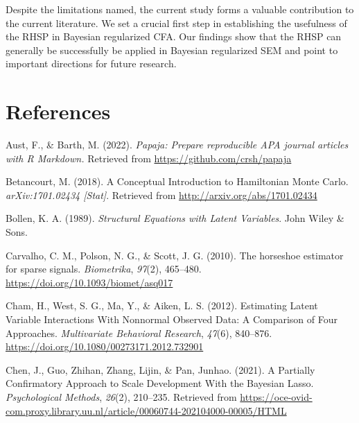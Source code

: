 \documentclass[
  man, donotrepeattitle,floatsintext]{apa6}
\newlength{\cslhangindent}
\newlength{\cslentryspacingunit} %
\newenvironment{CSLReferences}[2] %
 {%
  \setlength{\parindent}{0pt}
  \ifodd #1
  \let\oldpar\par
  \def\par{\hangindent=\cslhangindent\oldpar}
  \fi
  \setlength{\parskip}{#2\cslentryspacingunit}
 }%
 {}
\begin{document}
Despite the limitations named, the current study forms a valuable
contribution to the current literature. We set a crucial first step in
establishing the usefulness of the RHSP in Bayesian regularized CFA. Our
findings show that the RHSP can generally be successfully be applied in
Bayesian regularized SEM and point to important directions for future
research.

\clearpage

\begingroup
\setlength{\parindent}{-0.5in}
\setlength{\leftskip}{0.5in}

\section*{References}

\hypertarget{refs}{}
\begin{CSLReferences}{1}{0}
\leavevmode{}%
Aust, F., \& Barth, M. (2022). \emph{Papaja: {Prepare} reproducible {APA} journal articles with {R} {Markdown}.} Retrieved from \url{https://github.com/crsh/papaja}

\leavevmode{}%
Betancourt, M. (2018). A {Conceptual} {Introduction} to {Hamiltonian} {Monte} {Carlo}. \emph{arXiv:1701.02434 {[}Stat{]}}. Retrieved from \url{http://arxiv.org/abs/1701.02434}

\leavevmode{}%
Bollen, K. A. (1989). \emph{Structural {Equations} with {Latent} {Variables}}. John Wiley \& Sons.

\leavevmode{}%
Carvalho, C. M., Polson, N. G., \& Scott, J. G. (2010). The horseshoe estimator for sparse signals. \emph{Biometrika}, \emph{97}(2), 465--480. \url{https://doi.org/10.1093/biomet/asq017}

\leavevmode{}%
Cham, H., West, S. G., Ma, Y., \& Aiken, L. S. (2012). Estimating {Latent} {Variable} {Interactions} {With} {Nonnormal} {Observed} {Data}: {A} {Comparison} of {Four} {Approaches}. \emph{Multivariate Behavioral Research}, \emph{47}(6), 840--876. \url{https://doi.org/10.1080/00273171.2012.732901}

\leavevmode{}%
Chen, J., Guo, Zhihan, Zhang, Lijin, \& Pan, Junhao. (2021). A {Partially} {Confirmatory} {Approach} to {Scale} {Development} {With} the {Bayesian} {Lasso}. \emph{Psychological Methods}, \emph{26}(2), 210--235. Retrieved from \url{https://oce-ovid-com.proxy.library.uu.nl/article/00060744-202104000-00005/HTML}


\end{CSLReferences}
\end{document}
